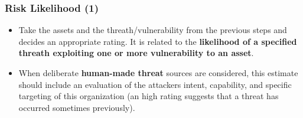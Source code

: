 \documentclass[xcolor ={table,usenames,dvipsnames}]{beamer}
\theoremstyle{definition}
\begin{document}
	\begin{frame}
		\frametitle{Risk Likelihood (1)}
		\begin{itemize}
			\item Take the assets and the threath/vulnerability from the previous steps and decides an appropriate rating. It is related to the \textbf{likelihood of a specified threath exploiting one or more vulnerability to an asset}.
			\item When deliberate \textbf{human-made threat} sources are considered, this
			estimate should include an evaluation of the attackers intent, capability, and specific targeting of this organization (an high rating suggests that a threat has occurred sometimes previously).
		\end{itemize}
	\end{frame}
\end{document}
